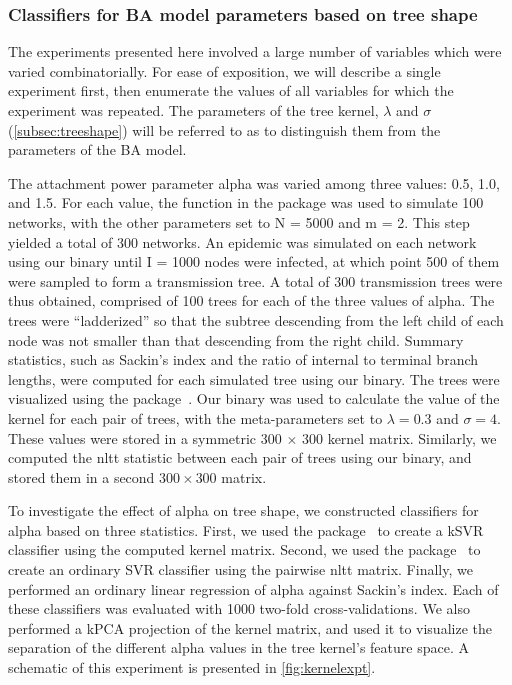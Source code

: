 \subsubsection*{Classifiers for BA model parameters based on tree shape}
\label{subsec:kernel}

The experiments presented here involved a large number of variables which were
varied combinatorially. For ease of exposition, we will describe a single
experiment first, then enumerate the values of all variables for which the
experiment was repeated. The parameters of the tree kernel, $\lambda$ and
$\sigma$ (\cref{subsec:treeshape}) will be referred to as
 to distinguish them from the parameters of the \gls{BA}
model. 

The attachment power parameter \gls{alpha} was varied among three values: 0.5,
1.0, and 1.5. For each value, the  function in the
 package was used to simulate 100 networks, with the other
parameters set to \gls{N} = 5000 and \gls{m} = 2. This step yielded a total of
300 networks. An epidemic was simulated on each network using our
 binary until \gls{I} = 1000 nodes were infected, at which
point 500 of them were sampled to form a transmission tree. A total of 300
transmission trees were thus obtained, comprised of 100 trees for each of the
three values of \gls{alpha}. The trees were ``ladderized'' so that the subtree
descending from the left child of each node was not smaller than that
descending from the right child. Summary statistics, such as Sackin's index and
the ratio of internal to terminal branch lengths, were computed for each
simulated tree using our  binary. The trees were visualized
using the  package~\autocite{paradis2004ape}. Our
 binary was used to calculate the value of the kernel for
each pair of trees, with the meta-parameters set to $\lambda = 0.3$ and $\sigma
= 4$. These values were stored in a symmetric 300 $\times$ 300 kernel matrix.
Similarly, we computed the \gls{nltt} statistic between each pair of trees
using our  binary, and stored them in a second $300 \times
300$ matrix.

To investigate the effect of \gls{alpha} on tree shape, we constructed
classifiers for \gls{alpha} based on three statistics. First, we used the
 package~\autocite{zeileis2004kernlab} to create a \gls{kSVR}
classifier using the computed kernel matrix. Second, we used the
 package~\autocite{meyer2015e1071} to create an ordinary
\gls{SVR} classifier using the pairwise \gls{nltt} matrix. Finally, we
performed an ordinary linear regression of \gls{alpha} against Sackin's index.
Each of these classifiers was evaluated with 1000 two-fold cross-validations.
We also performed a \gls{kPCA} projection of the kernel matrix, and used it to
visualize the separation of the different \gls{alpha} values in the tree
kernel's feature space. A schematic of this experiment is presented in
\cref{fig:kernelexpt}.

